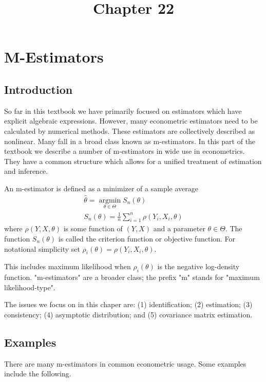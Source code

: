 \documentclass[10pt]{article}
\title{Chapter 22 }
\author{}
\date{}
\begin{document}
\maketitle
\section{M-Estimators}
\subsection{Introduction}
So far in this textbook we have primarily focused on estimators which have explicit algebraic expressions. However, many econometric estimators need to be calculated by numerical methods. These estimators are collectively described as nonlinear. Many fall in a broad class known as m-estimators. In this part of the textbook we describe a number of m-estimators in wide use in econometrics. They have a common structure which allows for a unified treatment of estimation and inference.

An m-estimator is defined as a minimizer of a sample average
$$
\begin{gathered}
\widehat{\theta}=\underset{\theta \in \Theta}{\operatorname{argmin}} S_{n}(\theta) \\
S_{n}(\theta)=\frac{1}{n} \sum_{i=1}^{n} \rho\left(Y_{i}, X_{i}, \theta\right)
\end{gathered}
$$
where $\rho(Y, X, \theta)$ is some function of $(Y, X)$ and a parameter $\theta \in \Theta$. The function $S_{n}(\theta)$ is called the criterion function or objective function. For notational simplicity set $\rho_{i}(\theta)=\rho\left(Y_{i}, X_{i}, \theta\right)$.

This includes maximum likelihood when $\rho_{i}(\theta)$ is the negative log-density function. "m-estimators" are a broader class; the prefix "m" stands for "maximum likelihood-type".

The issues we focus on in this chaper are: (1) identification; (2) estimation; (3) consistency; (4) asymptotic distribution; and (5) covariance matrix estimation.

\subsection{Examples}
There are many m-estimators in common econometric usage. Some examples include the following.
\end{document}
